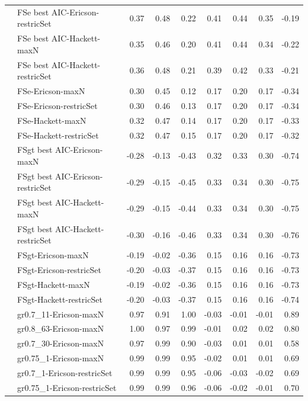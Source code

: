 {\begin{landscape}
\begin{footnotesize}
\begin{longtable}{@{}ll|rrr|rrr|r@{}}
 & FSe best AIC-Ericson-restricSet & 0.37 & 0.48 & 0.22 & 0.41 & 0.44 & 0.35 & -0.19\\
 & FSe best AIC-Hackett-maxN & 0.35 & 0.46 & 0.20 & 0.41 & 0.44 & 0.34 & -0.22\\
 & FSe best AIC-Hackett-restricSet & 0.36 & 0.48 & 0.21 & 0.39 & 0.42 & 0.33 & -0.21\\
 & FSe-Ericson-maxN & 0.30 & 0.45 & 0.12 & 0.17 & 0.20 & 0.17 & -0.34\\
 & FSe-Ericson-restricSet & 0.30 & 0.46 & 0.13 & 0.17 & 0.20 & 0.17 & -0.34\\
 & FSe-Hackett-maxN & 0.32 & 0.47 & 0.14 & 0.17 & 0.20 & 0.17 & -0.33\\
 & FSe-Hackett-restricSet & 0.32 & 0.47 & 0.15 & 0.17 & 0.20 & 0.17 & -0.32\\
\addlinespace
\multirow{8}{*}{FSgt} & FSgt best AIC-Ericson-maxN & -0.28 & -0.13 & -0.43 & 0.32 & 0.33 & 0.30 & -0.74\\
 & FSgt best AIC-Ericson-restricSet & -0.29 & -0.15 & -0.45 & 0.33 & 0.34 & 0.30 & -0.75\\
 & FSgt best AIC-Hackett-maxN & -0.29 & -0.15 & -0.44 & 0.33 & 0.34 & 0.30 & -0.75\\
 & FSgt best AIC-Hackett-restricSet & -0.30 & -0.16 & -0.46 & 0.33 & 0.34 & 0.30 & -0.76\\
 & FSgt-Ericson-maxN & -0.19 & -0.02 & -0.36 & 0.15 & 0.16 & 0.16 & -0.73\\
 & FSgt-Ericson-restricSet & -0.20 & -0.03 & -0.37 & 0.15 & 0.16 & 0.16 & -0.73\\
 & FSgt-Hackett-maxN & -0.19 & -0.02 & -0.36 & 0.15 & 0.16 & 0.16 & -0.73\\
 & FSgt-Hackett-restricSet & -0.20 & -0.03 & -0.37 & 0.15 & 0.16 & 0.16 & -0.74\\
\addlinespace
\multirow{14}{*}{Iteroparity} & gr0.7\_11-Ericson-maxN & 0.97 & 0.91 & 1.00 & -0.03 & -0.01 & -0.01 & 0.89\\
 & gr0.8\_63-Ericson-maxN & 1.00 & 0.97 & 0.99 & -0.01 & 0.02 & 0.02 & 0.80\\
 & gr0.7\_30-Ericson-maxN & 0.97 & 0.99 & 0.90 & -0.03 & 0.01 & 0.01 & 0.58\\
 & gr0.75\_1-Ericson-maxN & 0.99 & 0.99 & 0.95 & -0.02 & 0.01 & 0.01 & 0.69\\
 & gr0.7\_1-Ericson-restricSet & 0.99 & 0.99 & 0.95 & -0.06 & -0.03 & -0.02 & 0.69\\
 & gr0.75\_1-Ericson-restricSet & 0.99 & 0.99 & 0.96 & -0.06 & -0.02 & -0.01 & 0.70\\

\end{longtable}
\end{footnotesize}
\end{landscape}}
